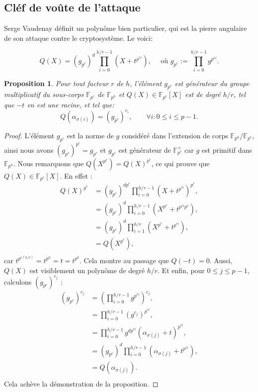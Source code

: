 \documentclass[a4paper, titlepage, 11pt]{article}
\newtheorem{prop}[theo]{Proposition}
\theoremstyle{definition}
\theoremstyle{remark}
\def\gf #1{\mathbb{F}_{#1}}
\newcommand{\extension}[2]{{#1} / {#2}} %
\begin{document}
\subsection{Cléf de voûte de l'attaque}\label{s-sec:clefVaudenay}

Serge Vaudenay définit un polynôme bien particulier, qui est la pierre angulaire de son attaque contre le cryptosystème. Le voici:

$$Q(X) = (g_{p^r})^{d} \prod_{i=0}^{h/r-1} \left(X+t^{p^{ri}}\right),
\quad \text{ où } g_{p^r} := \prod_{i=0}^{h/r-1} g^{p^{ri}}.$$

\begin{prop}\label{prop:vaudenay}
Pour tout facteur $r$ de $h$, l'élément $g_{p^r}$ est générateur du groupe multiplicatif du sous-corps $\gf{p^r}$ de $\gf{p^h}$ et $Q(X) \in \gf{p^r}[X]$ est de degré $h/r$, tel que $-t$ en est une racine, et tel que:
$$Q\left(\alpha_{\sigma(i)}\right) = (g_{p^r})^{c_i},\qquad \forall i : 0\leqslant i \leqslant p-1.$$
\end{prop}

\begin{proof}
L'élément $g_{p^r}$ est la norme de $g$ considéré dans l'extension de corps $\extension{\gf{p^h}}{\gf{p^r}}$, ainsi nous avons $( g_{p^r})^{p^r} =  g_{p^r}$ et $ g_{p^r}$ est générateur de $\gf{p^r}^\times$ car $ g$ est primitif dans $\gf{p^h}$. Nous remarquons que $Q\left(X^{p^r}\right) = Q(X)^{p^r}$, ce qui prouve que $Q(X) \in \gf{p^r}[X]$. En effet :
\begin{align*}
Q\left(X\right)^{p^r} &= ( g_{p^r})^{ dp^r} \prod_{i=0}^{h/r-1} \left(X+ t^{p^{ri}}\right)^{p^r}, \\
&= ( g_{p^r})^{ d} \prod_{i=0}^{h/r-1} \left(X^{p^r} +  t^{p^{ri}p^r}\right), \\
&= ( g_{p^r})^{ d} \prod_{i=1}^{h/r} \left(X^{p^r} +  t^{p^{ri}}\right), \\
&= Q\left(X^{p^r}\right), \\
\end{align*}
car $ t^{p^{r(h/r)}} =  t^{p^h} =  t =  t^{p^0}$. Cela montre au passage que $Q(- t) = 0$. Aussi, $Q(X)$ est visiblement un polynôme de degré $h/r$. Et enfin, pour $0\leqslant j \leqslant p-1$, calculons $( g_{p^r})^{c_j}$ :
\begin{align*}
( g_{p^r})^{c_j} &= \left(\prod_{i=0}^{h/r-1}  g^{p^{ri}}\right)^{c_j},\\
&= \prod_{i=0}^{h/r-1} \left( g^{c_j}\right)^{p^{ri}}, \\
&= \prod_{i=0}^{h/r-1}  g^{ dp^{ri}}\left(\alpha_{\sigma(j)} +  t\right)^{p^{ri}},\\
&= ( g_{p^r})^{ d} \prod_{i=0}^{h/r-1} \left(\alpha_{\sigma(j)} +  t^{p^{ri}}\right),\\
&= Q\left(\alpha_{\sigma(j)}\right). \\
\end{align*}
Cela achève la démonstration de la proposition.
\end{proof}
\end{document}
